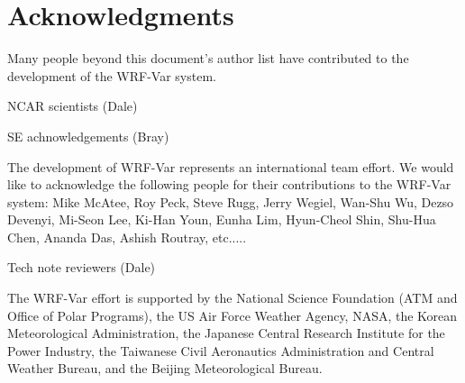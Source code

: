 \chapter*{Acknowledgments}

\hskip 15pt 
Many people beyond this document's author list have
contributed to the development of the WRF-Var system.

\vskip 10pt
NCAR scientists (Dale)

\vskip 10pt
SE achnowledgements (Bray)

\vskip 10pt
The development of WRF-Var represents an international team effort. 
We would like to acknowledge the following people for their 
contributions to the WRF-Var system: Mike McAtee, Roy Peck, Steve Rugg, 
Jerry Wegiel, Wan-Shu Wu, Dezso Devenyi, Mi-Seon Lee, Ki-Han Youn, Eunha Lim, 
Hyun-Cheol Shin, Shu-Hua Chen, Ananda Das, Ashish Routray, etc.....

\vskip 10pt
Tech note reviewers (Dale)

\vskip 10pt
The WRF-Var effort is supported by the National Science Foundation 
(ATM and Office of Polar Programs), the US Air Force Weather Agency, 
NASA, the Korean Meteorological Administration, the Japanese Central 
Research Institute for the Power Industry, the Taiwanese Civil 
Aeronautics Administration and Central Weather Bureau, and the Beijing 
Meteorological Bureau.
